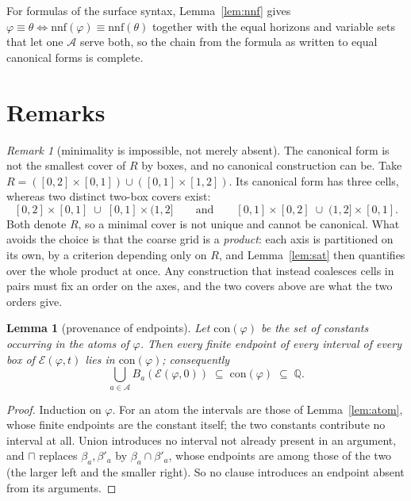 \documentclass[11pt,a4paper]{article}
\theoremstyle{plain}
\newtheorem{lemma}[theorem]{Lemma}
\theoremstyle{definition}
\theoremstyle{remark}
\newtheorem{remark}[theorem]{Remark}
\newcommand{\Q}{\mathbb{Q}}
\newcommand{\Ax}{\mathcal{A}}
\begin{document}
For formulas of the surface syntax, Lemma~\ref{lem:nnf} gives
$\varphi \equiv \theta \iff \mathrm{nnf}(\varphi) \equiv \mathrm{nnf}(\theta)$
together with the equal horizons and variable sets that let one $\Ax$ serve both,
so the chain from the formula as written to equal canonical forms is complete.

\section{Remarks}

\begin{remark}[minimality is impossible, not merely absent]
The canonical form is not the smallest cover of $R$ by boxes, and no canonical
construction can be. Take
$R = ([0,2]\times[0,1]) \cup ([0,1]\times[1,2])$. Its canonical form has three
cells, whereas two distinct two-box covers exist:
\[
  [0,2]\times[0,1] \;\cup\; [0,1]\times(1,2]
  \qquad\text{and}\qquad
  [0,1]\times[0,2] \;\cup\; (1,2]\times[0,1].
\]
Both denote $R$, so a minimal cover is not unique and cannot be canonical. What
avoids the choice is that the coarse grid is a \emph{product}: each axis is
partitioned on its own, by a criterion depending only on $R$, and
Lemma~\ref{lem:sat} then quantifies over the whole product at once. Any
construction that instead coalesces cells in pairs must fix an order on the axes,
and the two covers above are what the two orders give.
\end{remark}

\begin{lemma}[provenance of endpoints]\label{lem:prov}
Let $\mathrm{con}(\varphi)$ be the set of constants occurring in the atoms of
$\varphi$. Then every finite endpoint of every interval of every box of
$\mathcal{E}(\varphi,t)$ lies in $\mathrm{con}(\varphi)$; consequently
\[
  \bigcup_{a \in \Ax} B_a(\mathcal{E}(\varphi,0)) \;\subseteq\;
  \mathrm{con}(\varphi) \;\subseteq\; \Q .
\]
\end{lemma}

\begin{proof}
Induction on $\varphi$. For an atom the intervals are those of
Lemma~\ref{lem:atom}, whose finite endpoints are the constant itself; the two
constants contribute no interval at all. Union introduces no interval not already
present in an argument, and $\sqcap$ replaces $\beta_a, \beta'_a$ by $\beta_a
\cap \beta'_a$, whose endpoints are among those of the two (the larger left and
the smaller right). So no clause introduces an endpoint absent from its
arguments.
\end{proof}
\end{document}
